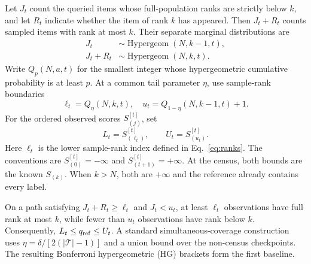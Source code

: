\documentclass[pdflatex,sn-basic,Numbered,iicol]{sn-jnl}
\begin{document}
Let $J_t$ count the queried items whose full-population ranks are strictly below $k$, and let $R_t$ indicate whether the item of rank $k$ has appeared. Then $J_t+R_t$ counts sampled items with rank at most $k$. Their separate marginal distributions are
\begin{equation}
 \begin{aligned}
 J_t&\sim\operatorname{Hypergeom}(N,k-1,t),\\
 J_t+R_t&\sim\operatorname{Hypergeom}(N,k,t).
 \end{aligned}
 \label{eq:hg}
\end{equation}
Write $Q_p(N,a,t)$ for the smallest integer whose hypergeometric cumulative probability is at least $p$. At a common tail parameter $\eta$, use sample-rank boundaries
\begin{equation}
 \ell_t=Q_\eta(N,k,t),\quad
 u_t=Q_{1-\eta}(N,k-1,t)+1.
 \label{eq:ranks}
\end{equation}
For the ordered observed scores $S^{[t]}_{(j)}$, set
\begin{equation}
 L_t=S_{(\ell_t)}^{[t]},\qquad U_t=S_{(u_t)}^{[t]}.
 \label{eq:bracket}
\end{equation}
Here $\ell_t$ is the lower sample-rank index defined in Eq.~\eqref{eq:ranks}. The conventions are $S^{[t]}_{(0)}=-\infty$ and $S^{[t]}_{(t+1)}=+\infty$. At the census, both bounds are the known $S_{(k)}$. When $k>N$, both are $+\infty$ and the reference already contains every label.

On a path satisfying $J_t+R_t\ge\ell_t$ and $J_t<u_t$, at least $\ell_t$ observations have full rank at most $k$, while fewer than $u_t$ observations have rank below $k$. Consequently, $L_t\le q_{\rm ref}\le U_t$. A standard simultaneous-coverage construction uses $\eta=\delta/[2(|\mathcal T|-1)]$ and a union bound over the non-census checkpoints. The resulting Bonferroni hypergeometric (HG) brackets form the first baseline.
\end{document}

